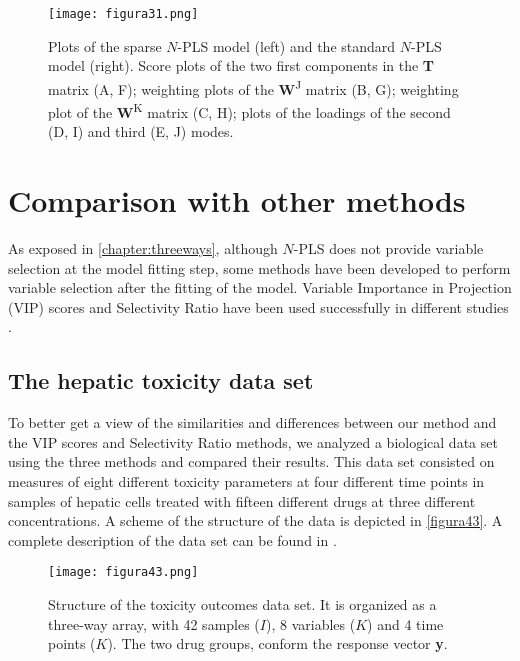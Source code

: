 \begin{figure}[hbtp]
	\centering
\texttt{[image: figura31.png]}
\caption[Plots of the sparse $N$-PLS model and the standard \textit{N}-PLS model]{Plots of the sparse $N$-PLS model (left) and the standard $N$-PLS model (right). Score plots of the two first components in the \textbf{T} matrix (A, F); weighting plots of the \textbf{W}\textsuperscript{J} matrix (B, G); weighting plot of the \textbf{W}\textsuperscript{K} matrix (C, H); plots of the loadings of the second (D, I) and third (E, J) modes.}
\label{figura31}
\end{figure}

\section{Comparison with other methods}
As exposed in \autoref{chapter:threeways}, although $N$-PLS does not provide variable selection at the model fitting step, some methods have been developed to perform variable selection after the fitting of the model. Variable Importance in Projection (VIP) scores \parencite{favilla2013assessing} and Selectivity Ratio \parencite{rajalahti2009biomarker} have been used successfully in different studies \parencite{favilla2014ranking, mostafapour2015n, yun2016variable}.

\subsection{The hepatic toxicity data set}
To better get a view of the similarities and differences between our method and the VIP scores and Selectivity Ratio methods, we analyzed a biological data set using the three methods and compared their results. This data set consisted on measures of eight different toxicity parameters at four different time points in samples of hepatic cells treated with fifteen different drugs at three different concentrations. A scheme of the structure of the data is depicted in \autoref{figura43}. A complete description of the data set can be found in \textcite{tolosa2018long}. 

\begin{figure}[hbtp]
	\centering
\texttt{[image: figura43.png]}
\caption[Structure of the toxicity outcomes data set]{Structure of the toxicity outcomes data set. It is organized as a three-way array, with 42 samples ($I$), 8 variables ($K$) and 4 time points ($K$). The two drug groups,  conform the response vector \textbf{y}.}
\label{figura43}
\end{figure}

